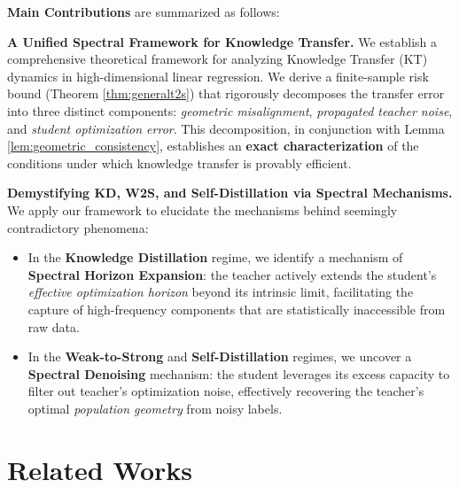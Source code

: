 \documentclass{article}
\theoremstyle{definition}
\theoremstyle{definition}
\theoremstyle{plain}
\theoremstyle{plain}
\theoremstyle{plain}
\theoremstyle{plain}
\theoremstyle{plain}
\begin{document}
\textbf{Main Contributions} are summarized as follows:

\textbf{A Unified Spectral Framework for Knowledge Transfer.} 
We establish a comprehensive theoretical framework for analyzing Knowledge Transfer (KT) dynamics in high-dimensional linear regression. We derive a finite-sample risk bound (Theorem \ref{thm:generalt2s}) that rigorously decomposes the transfer error into three distinct components: \emph{geometric misalignment}, \emph{propagated teacher noise}, and \emph{student optimization error}. This decomposition, in conjunction with Lemma \ref{lem:geometric_consistency}, establishes an \textbf{exact characterization} of the conditions under which knowledge transfer is provably efficient.

\textbf{Demystifying KD, W2S, and Self-Distillation via Spectral Mechanisms.} 
We apply our framework to elucidate the mechanisms behind seemingly contradictory phenomena:
\begin{itemize}
    \item In the \textbf{Knowledge Distillation} regime, we identify a mechanism of \textbf{Spectral Horizon Expansion}: the teacher actively extends the student's \textit{effective optimization horizon} beyond its intrinsic limit, facilitating the capture of high-frequency components that are statistically inaccessible from raw data.
    \item In the \textbf{Weak-to-Strong} and \textbf{Self-Distillation} regimes, we uncover a \textbf{Spectral Denoising} mechanism: the student leverages its excess capacity to filter out teacher's optimization noise, effectively recovering the teacher's optimal \textit{population geometry} from noisy labels.
\end{itemize}







\section{Related Works}
\label{sec:related_works}
\end{document}
